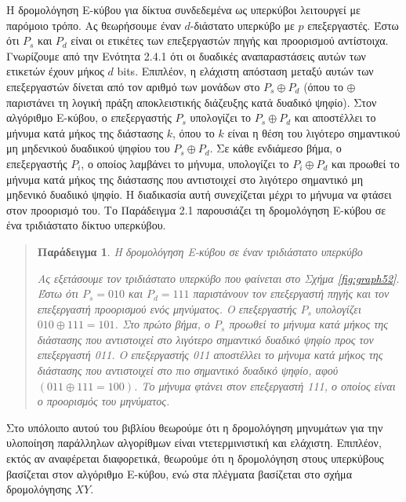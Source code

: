 \documentclass[12pt,a4paper]{article}
\newtheorem{paradeigma}{Παράδειγμα}
\begin{document}
Η δρομολόγηση Ε-κύβου για δίκτυα συνδεδεμένα ως υπερκύβοι λειτουργεί με 
παρόμοιο τρόπο. Ας θεωρήσουμε έναν $d$-διάστατο υπερκύβο με $p$ επεξεργαστές.
Έστω ότι $P_s$ και $P_d$ είναι οι ετικέτες των επεξεργαστών πηγής
και προορισμού αντίστοιχα. Γνωρίζουμε από την Ενότητα 2.4.1 ότι οι δυαδικές 
αναπαραστάσεις αυτών των ετικετών έχουν μήκος $d$ \foreignlanguage{english}{bits}.
Επιπλέον, η ελάχιστη απόσταση μεταξύ αυτών των επεξεργαστών δίνεται από 
τον αριθμό των μονάδων στο $P_s \oplus P_d$ (όπου το $\oplus$ παριστάνει 
τη λογική πράξη αποκλειστικής διάζευξης κατά δυαδικό ψηφίο).
Στον αλγόριθμο Ε-κύβου, ο επεξεργαστής $P_s$ υπολογίζει το $P_s \oplus P_d$
και αποστέλλει το μήνυμα κατά μήκος της διάστασης $k$, όπου το $k$ είναι 
η θέση του λιγότερο σημαντικού μη μηδενικού δυαδιικού ψηφίου του $P_s \oplus P_d$.
Σε κάθε ενδιάμεσο βήμα, ο επεξεργαστής $P_i$, ο οποίος λαμβάνει το μήνυμα,
υπολογίζει το $P_i \oplus P_d$ και προωθεί το μήνυμα κατά μήκος της 
διάστασης που αντιστοιχεί στο λιγότερο σημαντικό μη μηδενικό δυαδιικό ψηφίο.
Η διαδικασία αυτή συνεχίζεται μέχρι το μήνυμα να φτάσει στον προορισμό του.
Το Παράδειγμα 2.1 παρουσιάζει τη δρομολόγηση Ε-κύβου σε ένα τριδιάστατο 
δίκτυο υπερκύβου.

\begin{quote}
\begin{paradeigma} \label{par:3} H δρομολόγηση Ε-κύβου σε έναν τριδιάστατο 
  υπερκύβο

Ας εξετάσουμε τον τριδιάστατο υπερκύβο που φαίνεται στο Σχήμα 
\ref{fig:graph52}. Έστω ότι $P_s = 010$ και $P_d = 111$ παριστάνουν τον 
επεξεργαστή πηγής και τον επεξεργαστή προορισμού ενός μηνύματος. Ο 
επεξεργαστής $P_s$ υπολογίζει $010 \oplus 111 = 101$. Στο πρώτο βήμα, ο 
$P_s$ προωθεί το μήνυμα κατά μήκος της διάστασης που αντιστοιχεί στο 
λιγότερο σημαντικό δυαδικό ψηφίο προς τον επεξεργαστή 011. Ο επεξεργαστής 
011 αποστέλλει το μήνυμα κατά μήκος της διάστασης που αντιστοιχεί στο πιο 
σημαντικό δυαδικό ψηφίο, αφού $(011 \oplus 111 = 100)$. Το μήνυμα φτάνει 
στον επεξεργαστή 111, ο οποίος είναι ο προορισμός του μηνύματος.
\end{paradeigma}
\end{quote}

Στο υπόλοιπο αυτού του βιβλίου θεωρούμε ότι η δρομολόγηση μηνυμάτων για 
την υλοποίηση παράλληλων αλγορίθμων είναι ντετερμινιστική και ελάχιστη. 
Επιπλέον, εκτός αν αναφέρεται διαφορετικά, θεωρούμε ότι η δρομολόγηση στους 
υπερκύβους βασίζεται στον αλγόριθμο Ε-κύβου, ενώ στα πλέγματα βασίζεται 
στο σχήμα δρομολόγησης $XY$.
\end{document}

